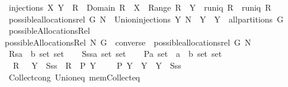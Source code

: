 \begin{isabellebody}
\isanewline
{}\isamarkupfalse%
\ {\isachardoublequoteopen}injections{\isacharprime}\ X\ Y\ {\isacharequal}{\isacharequal}\ {\isacharbraceleft}R\ {\isachardot}\ Domain\ R\ {\isacharequal}\ X\ {\isasymand}\ Range\ R\ {\isasymsubseteq}\ Y\ {\isasymand}\ runiq\ R\ {\isasymand}\ runiq\ {\isacharparenleft}R{\isasyminverse}{\isacharparenright}{\isacharbraceright}{\isachardoublequoteclose}\isanewline
\isanewline
{}\isamarkupfalse%
\ {\isachardoublequoteopen}possible{\isacharunderscore}allocations{\isacharunderscore}rel{\isacharprime}\ G\ N\ {\isacharequal}{\isacharequal}\ Union{\isacharbraceleft}injections{\isacharprime}\ Y\ N\ {\isacharbar}\ Y\ {\isachardot}\ Y\ {\isasymin}\ all{\isacharunderscore}partitions{\isacharprime}\ G{\isacharbraceright}{\isachardoublequoteclose}\isanewline
\isanewline
{}\isamarkupfalse%
\ possibleAllocationsRel\ \ \isanewline
{\isachardoublequoteopen}possibleAllocationsRel\ N\ G\ {\isacharequal}{\isacharequal}\ converse\ {\isacharbackquote}\ {\isacharparenleft}possible{\isacharunderscore}allocations{\isacharunderscore}rel\ G\ N{\isacharparenright}{\isachardoublequoteclose}\isanewline
\isanewline
{}\isamarkupfalse%
\isanewline
{}\isanewline
%
\isadelimproof
\ \ %
\endisadelimproof
%
\isatagproof
{}\isamarkupfalse%
\ Rs{\isacharcolon}{\isacharcolon}{\isachardoublequoteopen}{\isacharparenleft}{\isacharprime}a\ {\isasymtimes}\ {\isacharprime}b{\isacharparenright}\ set\ set{\isachardoublequoteclose}\isanewline
\ \ \isamarkupfalse%
\ Sss{\isacharcolon}{\isacharcolon}{\isachardoublequoteopen}{\isacharprime}a\ set\ set{\isachardoublequoteclose}\isanewline
\ \ \isamarkupfalse%
\ P{\isacharcolon}{\isacharcolon}{\isachardoublequoteopen}{\isacharprime}a\ set\ {\isasymRightarrow}\ {\isacharparenleft}{\isacharprime}a\ {\isasymtimes}\ {\isacharprime}b{\isacharparenright}\ set\ set{\isachardoublequoteclose}\isanewline
\ \ \isanewline
\ \ \isamarkupfalse%
\ {\isachardoublequoteopen}{\isacharbraceleft}\ R\ {\isachardot}\ {\isasymexists}\ Y\ {\isasymin}\ Sss\ {\isachardot}\ R\ {\isasymin}\ P\ Y\ {\isacharbraceright}\ {\isacharequal}\ {\isasymUnion}\ {\isacharbraceleft}\ P\ Y\ {\isacharbar}\ Y\ {\isachardot}\ Y\ {\isasymin}\ Sss\ {\isacharbraceright}{\isachardoublequoteclose}\ \isanewline
\ \ \isamarkupfalse%
\ Collect{\isacharunderscore}cong\ Union{\isacharunderscore}eq\ mem{\isacharunderscore}Collect{\isacharunderscore}eq\ \isamarkupfalse%

\end{isabellebody}
